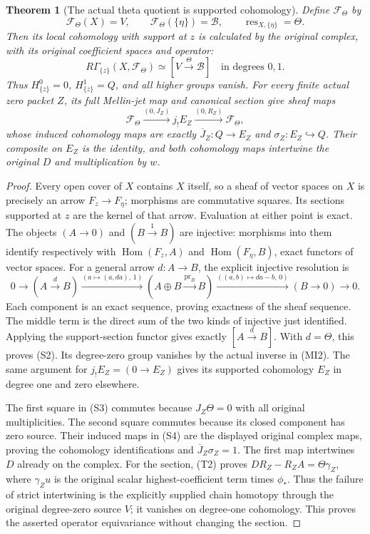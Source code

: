 \documentclass[11pt]{article}
\newtheorem{theorem}{Theorem}[section]
\newcommand{\B}{\mathscr B}\newcommand{\M}{\mathcal M}
\begin{document}
\begin{theorem}[The actual theta quotient is supported cohomology]
Define $\mathcal F_\Theta$ by
\[
 \mathcal F_\Theta(X)=V,\qquad
 \mathcal F_\Theta(\{\eta\})=\B,\qquad
 \operatorname{res}_{X,\{\eta\}}=\Theta.
 \tag{S1}
\]
Then its local cohomology with support at $z$ is calculated by the
original complex, with its original coefficient spaces and operator:
\[
 R\Gamma_{\{z\}}(X,\mathcal F_\Theta)\simeq[V\xrightarrow{\Theta}\B]
       \quad\text{in degrees }0,1.
 \tag{S2}
\]
Thus $H^0_{\{z\}}=0$, $H^1_{\{z\}}=Q$, and all higher groups vanish.
For every finite actual zero packet $Z$, its full Mellin-jet map and
canonical section give sheaf maps
\[
 \mathcal F_\Theta\xrightarrow{(0,J_Z)} j_!E_Z
           \xrightarrow{(0,R_Z)}\mathcal F_\Theta,
 \tag{S3}
\]
whose induced cohomology maps are exactly
$\overline J_Z:Q\to E_Z$ and $\sigma_Z:E_Z\hookrightarrow Q$.
Their composite on $E_Z$ is the identity, and both cohomology maps
intertwine the original $D$ and multiplication by $w$.
\end{theorem}
\begin{proof}
Every open cover of $X$ contains $X$ itself, so a sheaf of vector
spaces on $X$ is precisely an arrow $F_z\to F_\eta$; morphisms
are commutative squares. Its sections supported at $z$ are the
kernel of that arrow. Evaluation at either point is exact. The
objects $(A\to0)$ and $(B\xrightarrow{1}B)$ are injective: morphisms
into them identify respectively with $\operatorname{Hom}(F_z,A)$
and $\operatorname{Hom}(F_\eta,B)$, exact functors of vector spaces.
For a general arrow $d:A\to B$, the explicit injective resolution is
\[
 0\to(A\xrightarrow d B)
 \xrightarrow{(a\mapsto(a,da),\,1)}
 (A\oplus B\xrightarrow{\mathrm{pr}_B}B)
 \xrightarrow{((a,b)\mapsto da-b,\,0)}(B\to0)\to0.
 \tag{S4}
\]
Each component is an exact sequence, proving exactness of the sheaf
sequence. The middle term is the direct sum of the two kinds of
injective just identified. Applying the support-section functor
gives exactly $[A\xrightarrow d B]$. With $d=\Theta$, this proves
(S2). Its degree-zero group vanishes by the actual inverse in (MI2).
The same argument for $j_!E_Z=(0\to E_Z)$ gives its supported
cohomology $E_Z$ in degree one and zero elsewhere.

The first square in (S3) commutes because $J_Z\Theta=0$ with all
original multiplicities. The second square commutes because its
closed component has zero source. Their induced maps in (S4) are
the displayed original complex maps, proving the cohomology
identifications and $\overline J_Z\sigma_Z=1$. The first map
intertwines $D$ already on the complex. For the section, (T2) proves
$DR_Z-R_ZA=\Theta\gamma_Z$, where $\gamma_Zu$ is the original
scalar highest-coefficient term times $\phi_*$. Thus the failure
of strict intertwining is the explicitly supplied chain homotopy
through the original degree-zero source $V$; it vanishes on degree-one
cohomology. This proves the asserted operator equivariance without
changing the section.
\end{proof}
\end{document}
